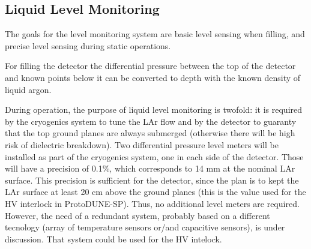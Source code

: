 \subsection{Liquid Level Monitoring}
\label{sec:fdsp-slow-cryo-liq-lev}

The goals for the level monitoring system are basic level sensing when filling, and precise level sensing during static operations. 

For filling the detector the differential pressure between the top of the
detector and known points below it can be converted to depth with the known
density of liquid argon.

During operation, the purpose of liquid level monitoring is twofold: it is required by the cryogenics system to tune the LAr flow and by the detector
to guaranty that the top ground planes are always submerged (otherwise there will be high risk of dielectric breakdown).  
Two differential pressure level meters will be installed as part of the cryogenics system, one in each side of the detector.
Those will have a precision of 0.1\%, which corresponds to 14 mm at the nominal LAr surface.
This precision is sufficient for the detector, since the plan is to kept the LAr surface at
least 20 cm above the ground planes (this is the value used for the HV interlock in
ProtoDUNE-SP). Thus, no additional level meters are required. However, the need of a redundant system, probably based on a different tecnology
(array of temperature sensors or/and capacitive sensors), is under discussion. That system could be used for the HV intelock. 


 
